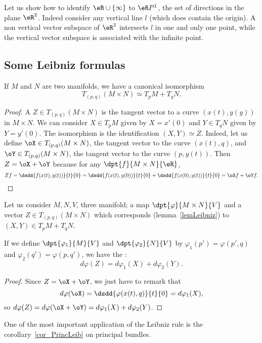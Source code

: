 Let us show how to identify $\eR\cup\{ \infty \}$ to $\eR P^1$, the set of directions in the plane $\eR^2$. Indeed consider any vertical line $l$ (which does contain the origin). A non vertical vector subspace of $\eR^2$ intersects $l$ in one and only one point, while the vertical vector subspace is associated with the infinite point.

\subsection{Some Leibniz formulas}

\begin{lemma}
	If $M$ and $N$ are two manifolds, we have a canonical isomorphism
	\[
		T_{(p,q)}(M\times N)\simeq T_pM+T_qN.
	\]
	\label{lemLeibniz}
\end{lemma}

\begin{proof}
	A $Z\in T_{(p,q)}(M\times N)$ is the tangent vector to a curve $(x(t),y(y))$ in $M\times N$. We can consider $X\in T_pM$ given by $X=x'(0)$ and $Y\in T_qN$ given by $Y=y'(0)$. The isomorphism is the identification $(X,Y)\simeq Z$. Indeed, let us define $\oX\in T_{(p,q)}(M\times N)$, the tangent vector to the curve $(x(t),q)$, and $\oY\in T_{(p,q)}(M\times N)$, the tangent vector to the curve $(p,y(t))$. Then $Z=\oX+\oY$ because for any $\dpt{f}{M\times N}{\eR}$,
	\begin{equation}
		Zf=\dsdd{f(x(t),y(t))}{t}{0}
		=\dsdd{f(x(t),y(0))}{t}{0}+\dsdd{f(x(0),y(t))}{t}{0}
		=\oX f+\oY f.
	\end{equation}
\end{proof}

\begin{proposition} \label{Leibniz}
	Let us consider $M,N,V$, three manifold; a map $\dpt{\varphi}{M\times N}{V}$ and a vector $Z\in T_{(p,q)}(M\times N)$ which corresponds (lemma~\ref{lemLeibniz}) to $(X,Y)\in T_pM+T_qN$.

	If we define $\dpt{\varphi_1}{M}{V}$ and  $\dpt{\varphi_2}{N}{V}$ by $\varphi_1(p')=\varphi(p',q)$ and $\varphi_2(q')=\varphi(p,q')$, we have the :
	\begin{equation}
		d\varphi(Z)=d\varphi_1(X)+d\varphi_2(Y).
	\end{equation}
\end{proposition}
\begin{proof}
	Since $Z=\oX+\oY$, we just have to remark that
	\[
		d\varphi(\oX)=\dsdd{\varphi(x(t),q)}{t}{0}=d\varphi_1(X),
	\]
	so $d\varphi(Z)=d\varphi(\oX+\oY)=d\varphi_1(X)+d\varphi_2(Y)$.
\end{proof}
One of the most important application of the Leibniz rule is the corollary~\ref{cor_PrincLeib} on principal bundles.

